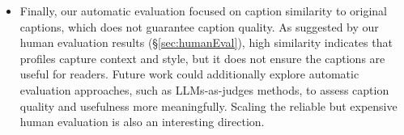 \begin{itemize}
\item 
Finally, our automatic evaluation focused on caption similarity to original captions, which does not guarantee caption quality.
As suggested by our human evaluation results (\S\ref{sec:humanEval}),
high similarity indicates that profiles capture context and style, but it does not ensure the captions are useful for readers.
Future work could additionally explore automatic evaluation approaches, such as LLMs-as-judges methods, to assess caption quality and usefulness more meaningfully.
Scaling the reliable but expensive human evaluation is also an interesting direction.

\end{itemize}


